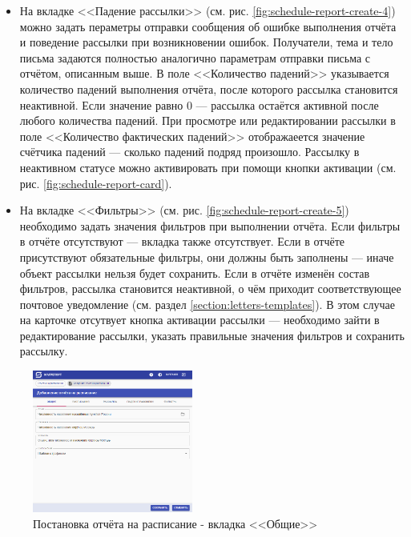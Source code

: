 \documentclass[../user-manual.tex]{subfiles}
\begin{document}
\begin{itemize}
		\item На вкладке <<Падение рассылки>> (см. рис. \ref{fig:schedule-report-create-4}) можно задать пераметры отправки сообщения об ошибке выполнения отчёта и поведение рассылки при возникновении ошибок. Получатели, тема и тело письма задаются полностью аналогично параметрам отправки письма с отчётом, описанным выше. В поле <<Количество падений>> указывается количество падений выполнения отчёта, после которого рассылка становится неактивной. Если значение равно 0 --- рассылка остаётся активной после любого количества падений. При просмотре или редактировании рассылки в поле <<Количество фактических падений>> отображаеется значение счётчика падений --- сколько падений подряд произошло. Рассылку в неактивном статусе можно активировать при помощи кнопки активации (см. рис. \ref{fig:schedule-report-card}).
		
		\item На вкладке <<Фильтры>> (см. рис. \ref{fig:schedule-report-create-5}) необходимо задать значения фильтров при выполнении отчёта. Если фильтры в отчёте отсутствуют --- вкладка также отсутствует. Если в отчёте присутствуют обязательные фильтры, они должны быть заполнены --- иначе объект рассылки нельзя будет сохранить. Если в отчёте изменён состав фильтров, рассылка становится неактивной, о чём приходит соответствующее почтовое уведомление (см. раздел \ref{section:letters-templates}). В этом случае на карточке отсутвует кнопка активации рассылки --- необходимо зайти в редактирование рассылки, указать правильные значения фильтров и сохранить рассылку.
		
	\end{itemize}

	\begin{figure}[h]
		\centering
		\includegraphics[width=0.47\textwidth]{img/30-schedule-report-create-1.png}
		\caption{Постановка отчёта на расписание - вкладка <<Общие>>}
		\label{fig:schedule-report-create-1}
	\end{figure}
\end{document}
